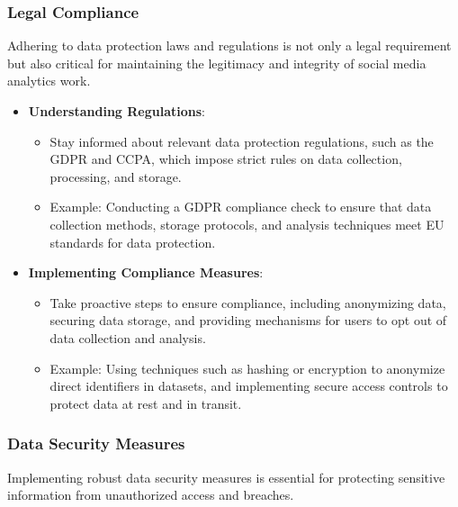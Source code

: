 \documentclass[
]{book}
\providecommand{\tightlist}{%
  \setlength{\itemsep}{0pt}\setlength{\parskip}{0pt}}
\begin{document}
\hypertarget{legal-compliance}{%
\subsubsection{Legal Compliance}\label{legal-compliance}}

Adhering to data protection laws and regulations is not only a legal requirement but also critical for maintaining the legitimacy and integrity of social media analytics work.

\begin{itemize}
\tightlist
\item
  \textbf{Understanding Regulations}:

  \begin{itemize}
  \tightlist
  \item
    Stay informed about relevant data protection regulations, such as the GDPR and CCPA, which impose strict rules on data collection, processing, and storage.
  \item
    Example: Conducting a GDPR compliance check to ensure that data collection methods, storage protocols, and analysis techniques meet EU standards for data protection.
  \end{itemize}
\item
  \textbf{Implementing Compliance Measures}:

  \begin{itemize}
  \tightlist
  \item
    Take proactive steps to ensure compliance, including anonymizing data, securing data storage, and providing mechanisms for users to opt out of data collection and analysis.
  \item
    Example: Using techniques such as hashing or encryption to anonymize direct identifiers in datasets, and implementing secure access controls to protect data at rest and in transit.
  \end{itemize}
\end{itemize}

\hypertarget{data-security-measures}{%
\subsubsection{Data Security Measures}\label{data-security-measures}}

Implementing robust data security measures is essential for protecting sensitive information from unauthorized access and breaches.
\end{document}
